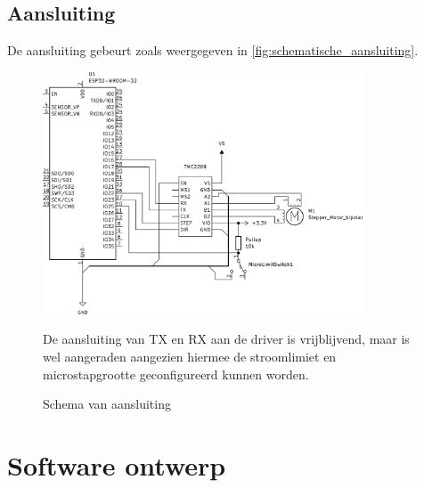 \begin{minipage}{\linewidth}
\subsection{Aansluiting}
De aansluiting gebeurt zoals weergegeven in \autoref{fig:schematische_aansluiting}.
\begin{figure}[H]
    \centering
    \includegraphics[width=0.85\textwidth]{figures/Wiring_BW.png}
    \caption{Schema van aansluiting}\label{fig:schematische_aansluiting}
    De aansluiting van TX en RX aan de driver is vrijblijvend, maar is wel aangeraden aangezien hiermee de stroomlimiet en microstapgrootte geconfigureerd kunnen worden.
\end{figure}
\end{minipage}

\section{Software ontwerp}

